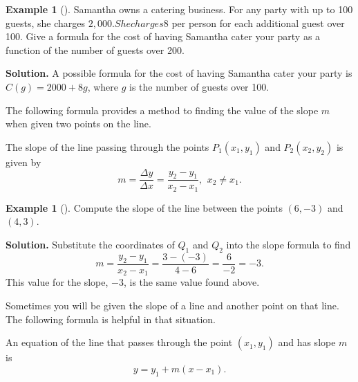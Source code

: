 \documentclass[10pt,]{book}
\theoremstyle{plain}
\theoremstyle{definition}
\theoremstyle{definition}
\theoremstyle{definition}
\newtheorem{example}[theorem]{Example}
\theoremstyle{definition}
\numberwithin{equation}{section}
\begin{document}
\begin{example}[]\label{example-linear-function2}
\hypertarget{p-74}{}%
Samantha owns a catering business. For any party with up to 100 guests, she charges $2,000. She charges $8 per person for each additional guest over 100. Give a formula for the cost of having Samantha cater your party as a function of the number of guests over 200.%
\par\smallskip%
\noindent\textbf{Solution.}\hypertarget{solution-4}{}\quad%
\hypertarget{p-75}{}%
A possible formula for the cost of having Samantha cater your party is \(C(g)=2000+8g\), where \(g\) is the number of guests over 100.%
\end{example}
\hypertarget{p-76}{}%
The following formula provides a method to finding the value of the slope \(m\) when given two points on the line.%
\begin{assemblage}\label{assemblage-5}
\hypertarget{p-77}{}%
The slope of the line passing through the points \(P_1 (x_1, y_1)\) and \(P_2 (x_2, y_2)\) is given by%
\begin{equation*}
m = \frac{\Delta y}{\Delta x}= \frac{y_2 - y_1}{x_2 - x_1} 
\text{, }~x_2 \ne x_1.
\end{equation*}
%
\end{assemblage}
\begin{example}[]\label{example-two-point-slope}
\hypertarget{p-78}{}%
Compute the slope of the line between the points \((6, -3)\) and \((4, 3)\).%
\par\smallskip%
\noindent\textbf{Solution.}\hypertarget{solution-5}{}\quad%
\hypertarget{p-79}{}%
Substitute the coordinates of \(Q_1\) and \(Q_2\) into the slope formula to find%
\begin{equation*}
m = \frac{y_2 - y_1}{x_2 - x_1}= \frac{3 - (-3)}{4 - 6}
= \frac{6}{-2}= -3.
\end{equation*}
This value for the slope, \(-3\), is the same value found above.%
\end{example}
\hypertarget{p-80}{}%
Sometimes you will be given the slope of a line and another point on that line. The following formula is helpful in that situation.%
\begin{assemblage}\label{assemblage-6}
\hypertarget{p-81}{}%
An equation of the line that passes through the point \((x_1, y_1)\) and has slope \(m\) is%
\begin{equation*}
y= y_1 + m(x- x_1).
\end{equation*}
%
\end{assemblage}
\end{document}
